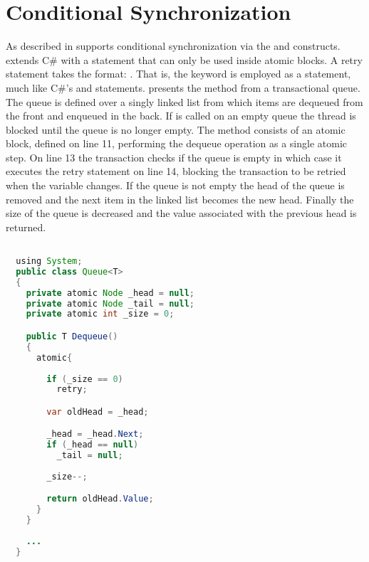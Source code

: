 \section{Conditional Synchronization}\label{sec:sync_design}
As described in  \stmnamesp supports conditional synchronization via the  and  constructs. \stmnamesp extends C\# with a  statement that can only be used inside atomic blocks. A retry statement takes the format: . That is, the keyword is employed as a statement, much like C\#'s  and  statements\cite[p. 102]{sestoft2011c}.  presents the  method from a transactional queue. The queue is defined over a singly linked list from which items are dequeued from the front and enqueued in the back. If  is called on an empty queue the thread is blocked until the queue is no longer empty. The  method consists of an atomic block, defined on line 11, performing the dequeue operation as a single atomic step. On line 13 the transaction checks if the queue is empty in which case it executes the retry statement on line 14, blocking the transaction to be retried when the  variable changes. If the queue is not empty the head of the queue is removed and the next item in the linked list becomes the new head. Finally the size of the queue is decreased and the value associated with the previous head is returned.

\begin{lstlisting}[label=lst:stm_atomic_syntax_retry,
 caption={Retry Syntax},
 language=Java, 
 showspaces=false,
 showtabs=false,
 breaklines=true,
 showstringspaces=false,
 breakatwhitespace=true,
 commentstyle=\color{greencomments},
 keywordstyle=\color{bluekeywords},
 stringstyle=\color{redstrings},
 morekeywords={atomic, retry, orElse, var, get, set, using}]  % Start your code-block

  using System;
  public class Queue<T>
  {
    private atomic Node _head = null;
    private atomic Node _tail = null;
    private atomic int _size = 0;

    public T Dequeue()
    {
      atomic{
 		
        if (_size == 0)
          retry;

        var oldHead = _head;

        _head = _head.Next;
        if (_head == null)
          _tail = null;
 			
        _size--;

        return oldHead.Value;
      }
    }
 	
 	...
  }
\end{lstlisting}

